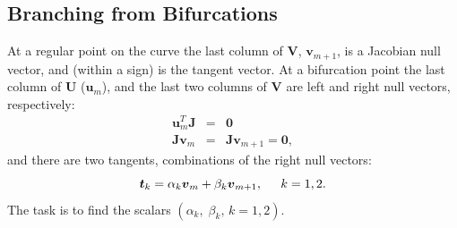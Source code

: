 \documentclass[11pt,openany,twoside]{book}
\numberwithin{equation}{section}		%
\newcommand{\Matrix}[1]{\boldsymbol{#1}}
\newcommand{\Vector}[1]{\boldsymbol{#1}}
\begin{document}
\subsection{Branching from Bifurcations}
At a regular point on the curve the last column of $\Matrix{V}$, $\Vector{v}_{m+1}$,
is a Jacobian null vector,
and (within a sign) is the tangent vector.
At a bifurcation point the last column of $\Matrix{U}$ ($\Vector{u}_m$),
and the last two columns of $\Matrix{V}$ are left and right null vectors, respectively:
\begin{eqnarray}
\Vector{u}_m^T\Matrix{J} &=& \Vector{0} \nonumber \\
\Matrix{J}\Vector{v}_m &=& \Matrix{J} \Vector{v}_{m+1} = \Vector{0},
\end{eqnarray}
and there are two tangents,
combinations of the right null vectors:
\begin{equation}
\label{eqn:tanb}
\Vector{t}_k = \alpha_k \Vector{v}_m + \beta_k \Vector{v}_{m+1}, \hspace{0.2in} k=1,2.
\end{equation}
The task is to find the scalars $(\alpha_k,\; \beta_k,\, k=1,2)$.
\end{document}
